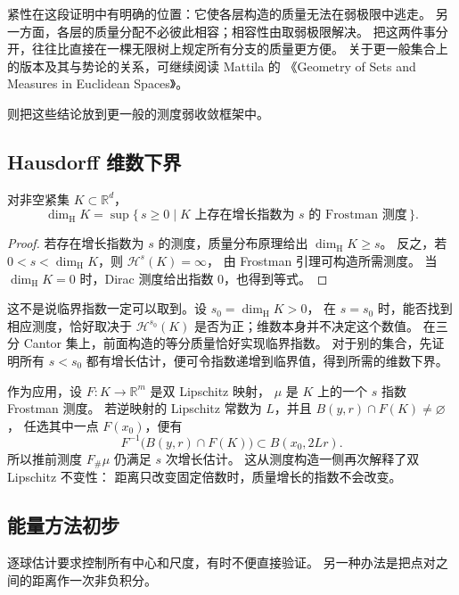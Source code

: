 紧性在这段证明中有明确的位置：它使各层构造的质量无法在弱极限中逃走。
另一方面，各层的质量分配不必彼此相容；相容性由取弱极限解决。
把这两件事分开，往往比直接在一棵无限树上规定所有分支的质量更方便。
关于更一般集合上的版本及其与势论的关系，可继续阅读 Mattila 的
《Geometry of Sets and Measures in Euclidean Spaces》\cite{Mattila1995Geometry}。

则把这些结论放到更一般的测度弱收敛框架中。

\subsection{Hausdorff 维数下界}
\label{b1:subsec:150403}

\begin{corollary}\label{b1:cor:frostman-dimension}
对非空紧集 \(K\subset\mathbb R^d\)，
\[
 \dim_{\mathrm H}K=
 \sup\{\,s\geq0\mid K\text{ 上存在增长指数为 }s\text{ 的 Frostman 测度}\,\}.
\]
\end{corollary}
\begin{proof}
若存在增长指数为 \(s\) 的测度，质量分布原理给出 \(\dim_{\mathrm H}K\geq s\)。
反之，若 \(0<s<\dim_{\mathrm H}K\)，则 \(\mathcal H^s(K)=\infty\)，
由 Frostman 引理可构造所需测度。
当 \(\dim_{\mathrm H}K=0\) 时，Dirac 测度给出指数 \(0\)，也得到等式。
\end{proof}

这不是说临界指数一定可以取到。设 \(s_0=\dim_{\mathrm H}K>0\)，
在 \(s=s_0\) 时，能否找到相应测度，恰好取决于
\(\mathcal H^{s_0}(K)\) 是否为正；维数本身并不决定这个数值。
在三分 Cantor 集上，前面构造的等分质量恰好实现临界指数。
对于别的集合，先证明所有 \(s<s_0\) 都有增长估计，便可令指数递增到临界值，得到所需的维数下界。

\ProseParagraphBreak

作为应用，设 \(F:K\rightarrow\mathbb R^m\) 是双 Lipschitz 映射，
\(\mu\) 是 \(K\) 上的一个 \(s\) 指数 Frostman 测度。
若逆映射的 Lipschitz 常数为 \(L\)，并且 \(B(y,r)\cap F(K)\ne\varnothing\)，
任选其中一点 \(F(x_0)\)，便有
\[
 F^{-1}\bigl(B(y,r)\cap F(K)\bigr)\subset B(x_0,2Lr).
\]
所以推前测度 \(F_\#\mu\) 仍满足 \(s\) 次增长估计。
这从测度构造一侧再次解释了双 Lipschitz 不变性：
距离只改变固定倍数时，质量增长的指数不会改变。

\subsection{能量方法初步}
\label{b1:subsec:150404}

逐球估计要求控制所有中心和尺度，有时不便直接验证。
另一种办法是把点对之间的距离作一次非负积分。


